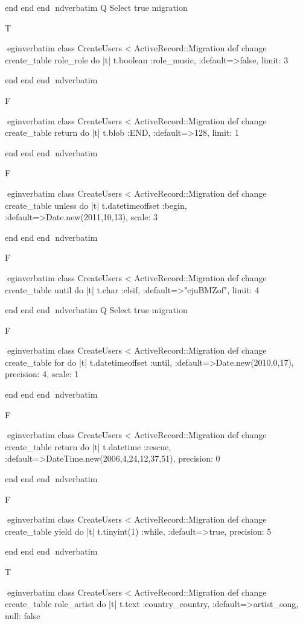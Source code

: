     end 
  end 
end
nd{verbatim}
Q
 Select true migration

T

egin{verbatim}
 class CreateUsers < ActiveRecord::Migration 
  def change 
    create_table role_role do |t| 
      t.boolean :role_music, :default=>false, limit: 3
    
    end 
  end 
end
nd{verbatim}

F

egin{verbatim}
 class CreateUsers < ActiveRecord::Migration 
  def change 
    create_table return do |t| 
      t.blob :END, :default=>128, limit: 1
    
    end 
  end 
end
nd{verbatim}

F

egin{verbatim}
 class CreateUsers < ActiveRecord::Migration 
  def change 
    create_table unless do |t| 
      t.datetimeoffset :begin, :default=>Date.new(2011,10,13), scale: 3
    
    end 
  end 
end
nd{verbatim}

F

egin{verbatim}
 class CreateUsers < ActiveRecord::Migration 
  def change 
    create_table until do |t| 
      t.char :elsif, :default=>"cjuBMZof", limit: 4
    
    end 
  end 
end
nd{verbatim}
Q
 Select true migration

F

egin{verbatim}
 class CreateUsers < ActiveRecord::Migration 
  def change 
    create_table for do |t| 
      t.datetimeoffset :until, :default=>Date.new(2010,0,17), precision: 4, scale: 1
    
    end 
  end 
end
nd{verbatim}

F

egin{verbatim}
 class CreateUsers < ActiveRecord::Migration 
  def change 
    create_table return do |t| 
      t.datetime :rescue, :default=>DateTime.new(2006,4,24,12,37,51), precision: 0
    
    end 
  end 
end
nd{verbatim}

F

egin{verbatim}
 class CreateUsers < ActiveRecord::Migration 
  def change 
    create_table yield do |t| 
      t.tinyint(1) :while, :default=>true, precision: 5
    
    end 
  end 
end
nd{verbatim}

T

egin{verbatim}
 class CreateUsers < ActiveRecord::Migration 
  def change 
    create_table role_artist do |t| 
      t.text :country_country, :default=>artist_song, null: false
    
